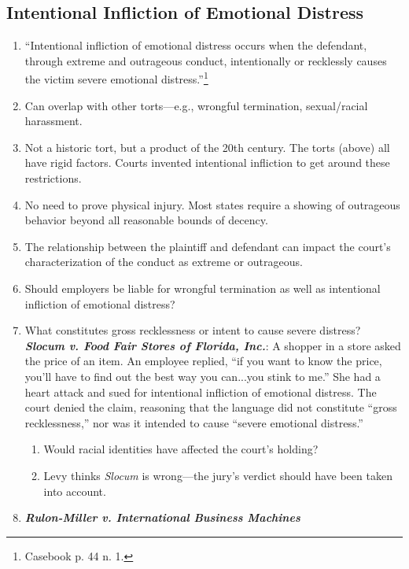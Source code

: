 \subsection{Intentional Infliction of Emotional Distress}

\begin{enumerate}
    \item ``Intentional infliction of emotional distress occurs when the 
    defendant, through extreme and outrageous conduct, intentionally or 
    recklessly causes the victim severe emotional 
    distress.''\footnote{Casebook p. 44 n. 1.}
    \item Can overlap with other torts---e.g., wrongful termination, 
    sexual/racial harassment.
    \item Not a historic tort, but a product of the 20th century. The torts 
    (above) all have rigid factors. Courts invented intentional infliction to 
    get around these restrictions.
    \item No need to prove physical injury. Most states require a showing of 
    outrageous behavior beyond all reasonable bounds of decency.
    \item The relationship between the plaintiff and defendant can impact the 
    court's characterization of the conduct as extreme or outrageous.
    \item Should employers be liable for wrongful termination as well as 
    intentional infliction of emotional distress?
    \item What constitutes gross recklessness or intent to cause severe 
    distress? \textbf{\emph{Slocum v. Food Fair Stores of Florida, Inc.}}: A 
    shopper in a store asked the price of an item. An employee replied, ``if 
    you want to know the price, you'll have to find out the best way you 
    can...you stink to me.'' She had a heart attack and sued for intentional 
    infliction of emotional distress. The court denied the claim, reasoning 
    that the language did not constitute ``gross recklessness,'' nor was it 
    intended to cause ``severe emotional distress.''
    \begin{enumerate}
        \item Would racial identities have affected the court's holding?
        \item Levy thinks \emph{Slocum} is wrong---the jury's verdict should 
        have been taken into account.
    \end{enumerate}
    \item \textbf{\emph{Rulon-Miller v. International Business Machines 
}}
\end{enumerate}
